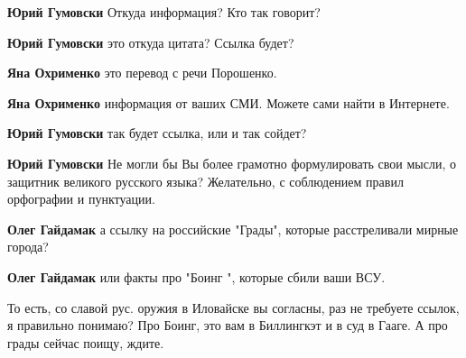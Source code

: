 \begin{itemize}
\textbf{Юрий Гумовски} Откуда информация? Кто так говорит?


\textbf{Юрий Гумовски} это откуда цитата? Ссылка будет?


\textbf{Яна Охрименко} это перевод с речи Порошенко.


\textbf{Яна Охрименко} информация от ваших СМИ. Можете сами найти в Интернете.


\textbf{Юрий Гумовски} так будет ссылка, или и так сойдет?


\textbf{Юрий Гумовски} Не могли бы Вы более грамотно формулировать свои мысли,
о защитник великого русского языка? Желательно, с соблюдением правил орфографии
и пунктуации.


\textbf{Олег Гайдамак} а ссылку на российские "Грады", которые расстреливали мирные города?


\textbf{Олег Гайдамак} или факты про "Боинг ", которые сбили ваши ВСУ.


То есть, со славой рус. оружия в Иловайске вы согласны, раз не требуете ссылок,
я правильно понимаю? Про Боинг, это вам в Биллингкэт и в суд в Гааге. А про
грады сейчас поищу, ждите.



\end{itemize}
